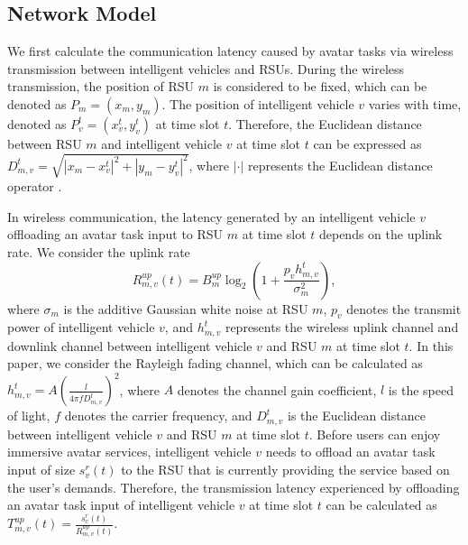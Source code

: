\documentclass[lettersize,journal]{IEEEtran}
\begin{document}
\subsection{Network Model}
We first calculate the communication latency caused by avatar tasks via wireless transmission between intelligent vehicles and RSUs. During the wireless transmission, the position of RSU $m$ is considered to be fixed, which can be denoted as $P_m = (x_m,y_m)$. The position of intelligent vehicle $v$ varies with time, denoted as $P_v^t = (x_v^t,y_v^t)$ at time slot $t$. Therefore, the Euclidean distance between RSU $m$ and intelligent vehicle $v$ at time slot $t$ can be expressed as $D_{m,v}^t = \sqrt{|x_m-x_v^t|^2+|y_m-y_v^t|^2}$, where $|\cdot|$ represents the Euclidean distance operator \cite{Lee1993Euclid}.

In wireless communication, the latency generated by an intelligent vehicle $v$ offloading an avatar task input to RSU $m$ at time slot $t$ depends on the uplink rate. We consider the uplink rate~\cite{shannon2001mathematical}  
\begin{equation}
R^{up}_{m,v}(t)=B_m^{up}\log_2(1+\frac{p_v h_{m,v}^t}{\sigma^2_m}),\label{eq2}
\end{equation}
where $\sigma_m$ is the additive Gaussian white noise at RSU $m$, $p_v$ denotes the transmit power of intelligent vehicle $v$, and $h_{m,v}^t$ represents the wireless uplink channel and downlink channel between intelligent vehicle $v$ and RSU $m$ at time slot $t$. In this paper, we consider the Rayleigh fading channel, which can be calculated as $h_{m,v}^t = A(\frac{l}{4\pi f D_{m,v}^t})^2$, where $A$ denotes the channel gain coefficient, $l$ is the speed of light, $f$ denotes the carrier frequency, and $D_{m,v}^t$ is the Euclidean distance between intelligent vehicle $v$ and RSU $m$ at time slot $t$. Before users can enjoy immersive avatar services, intelligent vehicle $v$ needs to offload an avatar task input of size $s_v^{r}(t)$ to the RSU that is currently providing the service based on the user's demands.
Therefore, the transmission latency experienced by offloading an avatar task input of intelligent vehicle $v$ at time slot $t$ can be calculated as $T^{up}_{m,v}(t)=\frac{s_v^{r}(t)}{R^{up}_{m,v}(t)}$.    
\end{document}
